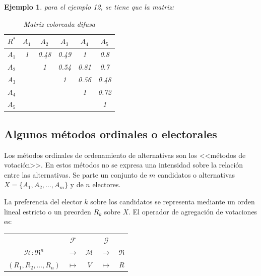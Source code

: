 \documentclass[a5paper,doc,10pt,noapacite]{apa6}
\newtheorem{ejem}{Ejemplo}
\begin{document}
{{\begin{ejem} para el ejemplo 12, se tiene que la matriz:

\begin{table}[H]
   \fontsize{7}{11}\selectfont
   	\captionsetup{justification=centering, labelfont=footnotesize, font=footnotesize}
    \centering
	\begin{tabular}{c|ccccc} \thickline
	\(R^*\) & \(A_1\) & \(A_2\) & \(A_3\) & \(A_4\) & \(A_5\)  \\ \hline
    \(A_1\) & \cellcolor{pastelyellow} 1 & \cellcolor{pastelyellow} 0.48 & \cellcolor{pastelgray} 0.49 & \cellcolor{paleblue} 1 & \cellcolor{paleblue} 0.8  \\
    \(A_2\) &  & \cellcolor{pastelyellow} 1 & \cellcolor{pastelgray} 0.54 & \cellcolor{paleblue} 0.81 & \cellcolor{paleblue} 0.7  \\
	\(A_3\) &  &  & \cellcolor{pastelyellow} 1 & \cellcolor{palegreen} 0.56 & \cellcolor{pastelgray} 0.48 \\
	\(A_4\) &  &  &  & \cellcolor{pastelyellow} 1 & \cellcolor{paleblue} 0.72   \\
	\(A_5\) &  &  &  &  & \cellcolor{pastelyellow} 1  \\
    \end{tabular}
    \caption*{Matriz coloreada difusa}
\label{tab:B4} 
\end{table}
\end{ejem}

\subsection{Algunos métodos ordinales o electorales}

Los métodos ordinales de ordenamiento de alternativas son los <<métodos de votación>>. En estos métodos no se expresa una intensidad sobre la relación entre las alternativas. Se parte un conjunto de \(m\) candidatos o alternativas \(X = \{A_1, A_2, \dots ,A_m\}\) y de \(n\)  electores. 

\vspace{1\baselineskip}
La preferencia del elector \(k\)  sobre los candidatos se representa mediante un orden lineal estricto o un preorden \(R_k\) sobre \(X\). El operador de agregación de votaciones es:

\begin{table}[H]
\fontsize{7}{11}\selectfont
\begin{center}
\begin{tabular}{c c c c c }
	        & \(\mathcal{F}\) &  & \(\mathcal{G} \)&  \\
    \(\mathcal{H}: \Re ^n\) & \(\rightarrow \) & \(\mathcal{M}\) & \(\rightarrow \)& \(\Re\)  \\
    \((R_1,R_2,\dots, R_n)\) & \(\mapsto\) & \(V\) &  \(\mapsto\) & \(R\) \\
\end{tabular}
\label{tab:B31} 
\end{center}
\end{table}
\vspace{-1\baselineskip}

}}
\end{document}
